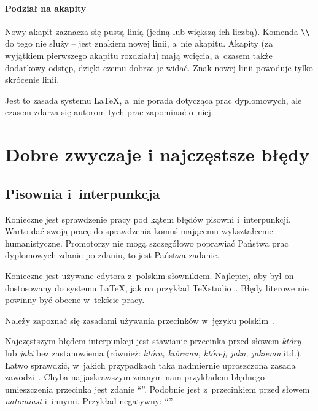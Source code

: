 \paragraph{Podział na akapity}
\label{sec:dod:akapity}

Nowy akapit zaznacza się pustą linią (jedną lub większą ich liczbą). Komenda \verb+\\+ do tego nie służy -- jest znakiem nowej linii, a~nie akapitu. Akapity (za wyjątkiem pierwszego akapitu rozdziału) mają wcięcia, a~czasem także dodatkowy odstęp, dzięki czemu dobrze je widać. Znak nowej linii powoduje tylko skrócenie linii.

Jest to zasada systemu \LaTeX, a~nie porada dotycząca prac dyplomowych, ale czasem zdarza się autorom tych prac zapominać o~niej. 


\section{Dobre zwyczaje i najczęstsze błędy}

\subsection{Pisownia i~interpunkcja}
\label{sec:dod:pisownia-interpunkcja}

Konieczne jest sprawdzenie pracy pod kątem błędów pisowni i~interpunkcji. Warto dać swoją pracę do sprawdzenia komuś mającemu wykształcenie humanistyczne. Promotorzy nie mogą szczegółowo poprawiać Państwa prac dyplomowych zdanie po zdaniu, to jest Państwa zadanie.

Konieczne jest używane edytora z~polskim słownikiem. Najlepiej, aby był on dostosowany do systemu \LaTeX, jak na przykład TeXstudio~. Błędy literowe nie powinny być obecne w~tekście pracy. 

Należy zapoznać się zasadami używania przecinków w~języku polskim~. 

Najczęstszym błędem interpunkcji jest stawianie przecinka przed słowem {\em który} lub {\em jaki} bez zastanowienia (również: {\em która, któremu, której, jaka, jakiemu} itd.). Łatwo sprawdzić, w~jakich przypadkach taka nadmiernie uproszczona zasada zawodzi~. Chyba najjaskrawszym znanym nam przykładem błędnego umieszczenia przecinka jest zdanie ``''. Podobnie jest z~przecinkiem przed słowem {\em natomiast\/} i~innymi. Przykład negatywny: ``''.


